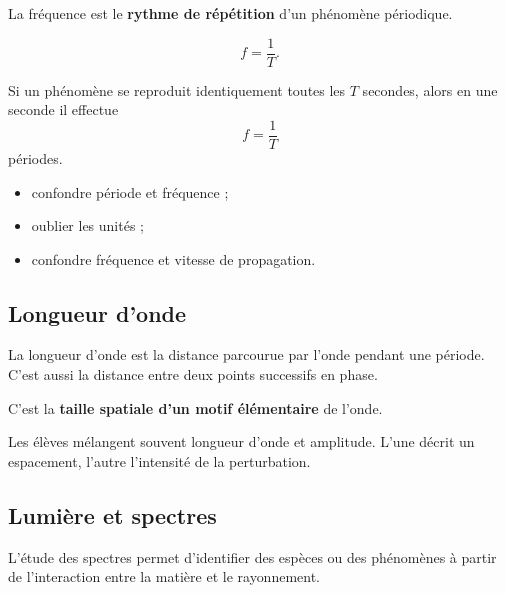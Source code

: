 \documentclass[11pt,a4paper]{article}
\begin{document}
\begin{imagem}
La fréquence est le \textbf{rythme de répétition} d'un phénomène périodique.
\end{imagem}

\begin{bilan}
\[
f=\frac{1}{T}.
\]
\end{bilan}

\begin{demo}
Si un phénomène se reproduit identiquement toutes les \(T\) secondes,
alors en une seconde il effectue
\[
f=\frac{1}{T}
\]
périodes.
\end{demo}

\begin{erreurs}
\begin{itemize}
    \item confondre période et fréquence ;
    \item oublier les unités ;
    \item confondre fréquence et vitesse de propagation.
\end{itemize}
\end{erreurs}

\subsection{Longueur d'onde}

\begin{sens}
La longueur d'onde est la distance parcourue par l'onde pendant une période.
C'est aussi la distance entre deux points successifs en phase.
\end{sens}

\begin{imagem}
C'est la \textbf{taille spatiale d'un motif élémentaire} de l'onde.
\end{imagem}

\begin{fausseintuition}
Les élèves mélangent souvent longueur d'onde et amplitude.
L'une décrit un espacement, l'autre l'intensité de la perturbation.
\end{fausseintuition}

\subsection{Lumière et spectres}

\begin{sens}
L'étude des spectres permet d'identifier des espèces ou des phénomènes à partir de l'interaction entre la matière et le rayonnement.
\end{sens}
\end{document}
